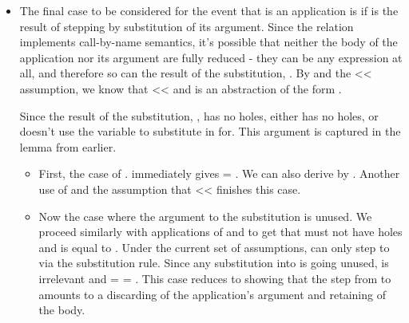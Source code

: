 \documentclass[12pt]{report}
\begin{document}
\begin{itemize}
\item  The final case to be considered for the event that  is an
    application is if  is the result of  stepping by
    substitution of its argument.  Since the  relation
    implements call-by-name semantics, it's possible that neither the
    body of the application nor its argument are fully reduced - they
    can be any expression at all, and therefore so can the result of
    the substitution, . By  and the  << 
    assumption, we know that  <<  and  is an
    abstraction of the form    .


    Since the result of the substitution, , has no holes, either
     has no holes, or  doesn't use the variable to
    substitute in for. This argument is captured in the
     lemma from earlier. 



\begin{itemize}
\item  First, the case of  . 
      immediately gives  = . We can also derive 
       by . Another use of
       and the assumption that  <<
       finishes this case.



\item  Now the case where the argument to the substitution is
      unused. We proceed similarly with applications of
       and  to get that
       must not have holes and is equal to . Under the
      current set of assumptions,  can only step to  via the
      substitution rule. Since any substitution into  is
      going unused,  is irrelevant and  = 
      = . This case reduces to showing that the step from  to
       amounts to a discarding of the application's argument and
      retaining of the body. 

\end{itemize}

\end{itemize}
\end{document}

